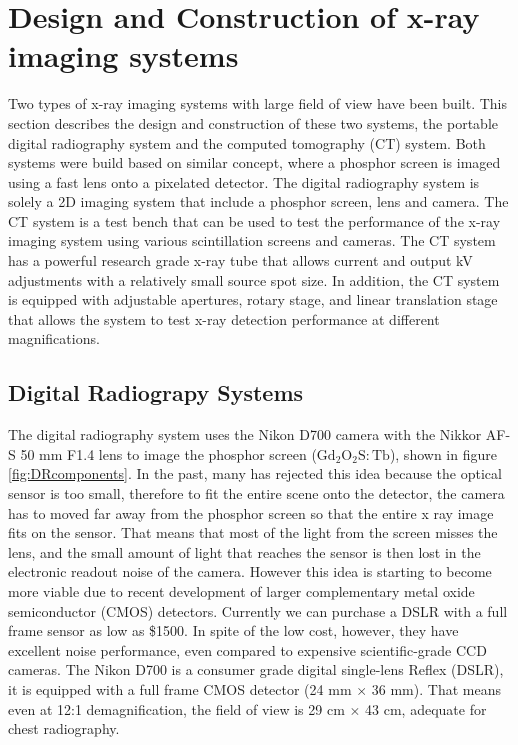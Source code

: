 \chapter{Design and Construction of x-ray imaging systems}
\label{chap:design_construction}

Two types of x-ray imaging systems with large field of view have been built.  This section describes the design and construction of these two systems, the portable digital radiography system and the computed tomography (CT) system.  Both systems were build based on similar concept, where a phosphor screen is imaged using a fast lens onto a pixelated detector.  The digital radiography system is solely a 2D imaging system that include a phosphor screen, lens and camera.  The CT system is a test bench that can be used to test the performance of the x-ray imaging system using various scintillation screens and cameras.  The CT system has a powerful research grade x-ray tube that allows current and output kV adjustments with a relatively small source spot size.  In addition, the CT system is equipped with adjustable apertures, rotary stage, and linear translation stage that allows the system to test x-ray detection performance at different magnifications.

\section{Digital Radiograpy Systems}
The digital radiography system uses the Nikon D700 camera with the Nikkor AF-S 50 mm F1.4 lens to image the phosphor screen ($\mathrm{Gd_2O_2S:Tb}$), shown in figure \ref{fig:DRcomponents}.  In the past, many has rejected this idea because the optical sensor is too small, therefore to fit the entire scene onto the detector, the camera has to moved far away from the phosphor screen so that the entire x ray image fits on the sensor.  That means that most of the light from the screen misses the lens, and the small amount of light that reaches the sensor is then lost in the electronic readout noise of the camera.  However this idea is starting to become more viable due to recent development of larger complementary metal oxide semiconductor (CMOS) detectors.  Currently we can purchase a DSLR with a full frame sensor as low as \$1500.  In spite of the low cost, however, they have excellent noise performance, even compared to expensive scientific-grade CCD cameras.  The Nikon D700 is a consumer grade digital single-lens Reflex (DSLR), it is equipped with a full frame CMOS detector (24 mm $\times$ 36 mm).  That means even at 12:1 demagnification, the field of view is 29 cm $\times$ 43 cm, adequate for chest radiography.  

